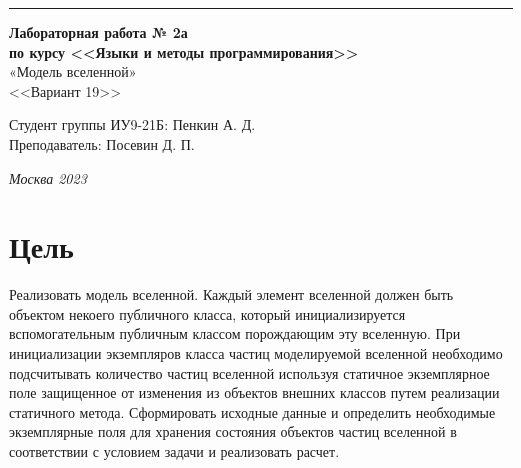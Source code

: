 ﻿\documentclass[a4paper, 12pt]{extarticle}
\begin{document}
\begin{titlepage}
\vspace*{-16pt}
\hspace{30pt}\rule{0.866\textwidth}{0.4pt}
  
\vspace{6em}

\begin{center}
\Large {\bf Лабораторная работа № 2а} \\ 
\large {\bf по курсу <<Языки и методы программирования>>} \\ 
\large «Модель вселенной» \\
\large <<Вариант 19>>
\end{center}\normalsize

\vspace{15em}


\begin{flushright}
  {Студент группы ИУ9-21Б: Пенкин А. Д.\hspace*{15pt} \\
  \vspace{2ex}
  Преподаватель: Посевин Д. П.\hspace*{15pt}}
\end{flushright}

\bigskip

\vfill
 \vspace{7em}

\begin{center}
\textsl{Москва 2023}
\end{center}
\end{titlepage}

\renewcommand{\ttdefault}{pcr}

\setlength{\tabcolsep}{3pt}
\newpage
\setcounter{page}{2}

\section{Цель}\label{Sect::task}
\par
Реализовать модель вселенной. Каждый элемент вселенной должен быть объектом некоего публичного класса, который инициализируется вспомогательным публичным классом порождающим эту вселенную. При инициализации экземпляров класса частиц моделируемой вселенной
необходимо подсчитывать количество частиц вселенной используя статичное экземплярное поле защищенное от изменения из объектов внешних классов путем реализации статичного метода. Сформировать исходные данные и определить необходимые экземплярные поля для хранения состояния объектов частиц вселенной в соответствии с условием задачи и реализовать расчет.
\end{document}
